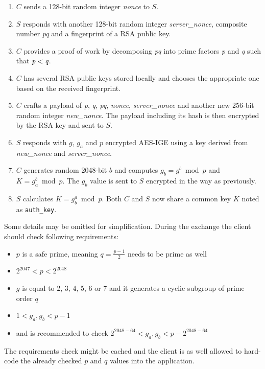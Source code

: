 \documentclass[thesis=M,english]{FITthesis}[2012/10/20]
\begin{document}
\begin{enumerate}
	\item $C$ sends a 128-bit random integer \emph{nonce} to $S$.
	\item $S$ responds with another 128-bit random integer \emph{server\_nonce}, composite number \emph{pq} and a fingerprint of a RSA public key.
	\item $C$ provides a proof of work by decomposing \emph{pq} into prime factors \emph{p} and \emph{q} such that $\emph{p} < \emph{q}$.
	\item $C$ has several RSA public keys stored locally and chooses the appropriate one based on the received fingerprint.
	\item $C$ crafts a payload of \emph{p}, \emph{q}, \emph{pq}, \emph{nonce}, \emph{server\_nonce} and another new 256-bit random integer \emph{new\_nonce}. The payload including its hash is then encrypted by the RSA key and sent to $S$.
	\item $S$ responds with $g$, $g_a$ and $p$ encrypted AES-IGE using a key derived from \emph{new\_nonce} and \emph{server\_nonce}.\label{crypto-initialization-6}
	\item $C$ generates random 2048-bit $b$ and computes $g_b = g^b \bmod p$ and $K = g_a^b \bmod p$. The $g_b$ value is sent to $S$ encrypted in the way as previously.
	\item $S$ calculates $K = g_b^a \bmod p$. Both $C$ and $S$ now share a common key $K$ noted as \texttt{auth\_key}.
\end{enumerate}

Some details may be omitted for simplification. During the exchange the client should check following requirements:\label{crypto-prime-req}

\begin{itemize}
	\item $p$ is a safe prime, meaning $q = \frac{p-1}{2}$ needs to be prime as well
	\item $2^{2047} < p < 2^{2048}$
	\item $g$ is equal to 2, 3, 4, 5, 6 or 7 and it generates a cyclic subgroup of prime order $q$
	\item $1 < g_a, g_b < p-1$
	\item and is recommended to check $2^{2048-64} < g_a, g_b < p - 2^{2048-64}$
\end{itemize}

The requirements check might be cached and the client is as well allowed to hard-code the already checked $p$ and $q$ values into the application.
\end{document}
